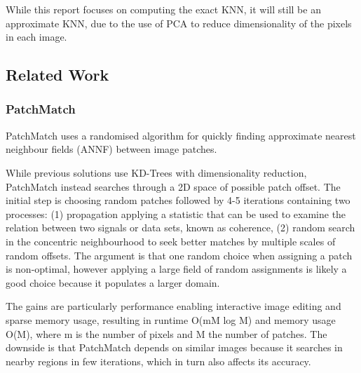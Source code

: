 While this report focuses on computing the exact KNN, it will still be an approximate KNN, due to the use of PCA to reduce dimensionality of the pixels in each image. 





\subsection{Related Work}


\subsubsection{PatchMatch}
PatchMatch uses a randomised algorithm for quickly finding approximate nearest neighbour fields (ANNF) between image patches. 

While previous solutions use KD-Trees with dimensionality reduction, PatchMatch instead searches through a 2D space of possible patch offset. 
The initial step is choosing random patches followed by 4-5 iterations containing two processes: (1) propagation applying a statistic that can be used to examine the relation between two signals or data sets, known as coherence, (2) random search in the concentric neighbourhood to seek better matches by multiple scales of random offsets. The argument is that one random choice when assigning a patch is non-optimal, however applying a large field of random assignments is likely a good choice because it populates a larger domain. 

The gains are particularly performance enabling interactive image editing and sparse memory usage, resulting in runtime O(mM log M) and memory usage O(M), where m is the number of pixels and M the number of patches. The downside is that PatchMatch depends on similar images because it searches in nearby regions in few iterations, which in turn also affects its accuracy. 



